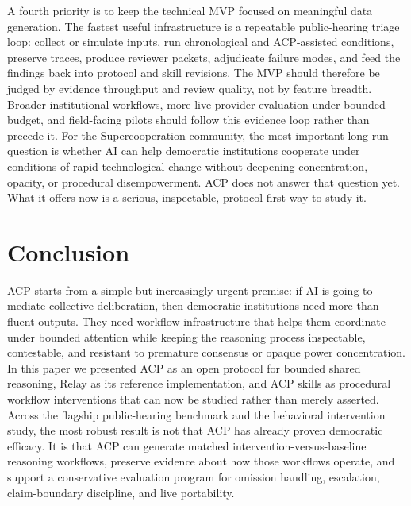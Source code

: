 \documentclass[11pt]{article}
\begin{document}
\vspace{0.1in}
A fourth priority is to keep the technical MVP focused on meaningful data generation. The fastest useful infrastructure is a repeatable public-hearing triage loop: collect or simulate inputs, run chronological and ACP-assisted conditions, preserve traces, produce reviewer packets, adjudicate failure modes, and feed the findings back into protocol and skill revisions. The MVP should therefore be judged by evidence throughput and review quality, not by feature breadth. Broader institutional workflows, more live-provider evaluation under bounded budget, and field-facing pilots should follow this evidence loop rather than precede it. For the Supercooperation community, the most important long-run question is whether AI can help democratic institutions cooperate under conditions of rapid technological change without deepening concentration, opacity, or procedural disempowerment. ACP does not answer that question yet. What it offers now is a serious, inspectable, protocol-first way to study it.

\section{Conclusion}

ACP starts from a simple but increasingly urgent premise: if AI is going to mediate collective deliberation, then democratic institutions need more than fluent outputs. They need workflow infrastructure that helps them coordinate under bounded attention while keeping the reasoning process inspectable, contestable, and resistant to premature consensus or opaque power concentration. In this paper we presented ACP as an open protocol for bounded shared reasoning, Relay as its reference implementation, and ACP skills as procedural workflow interventions that can now be studied rather than merely asserted. Across the flagship public-hearing benchmark and the behavioral intervention study, the most robust result is not that ACP has already proven democratic efficacy. It is that ACP can generate matched intervention-versus-baseline reasoning workflows, preserve evidence about how those workflows operate, and support a conservative evaluation program for omission handling, escalation, claim-boundary discipline, and live portability.
\end{document}
